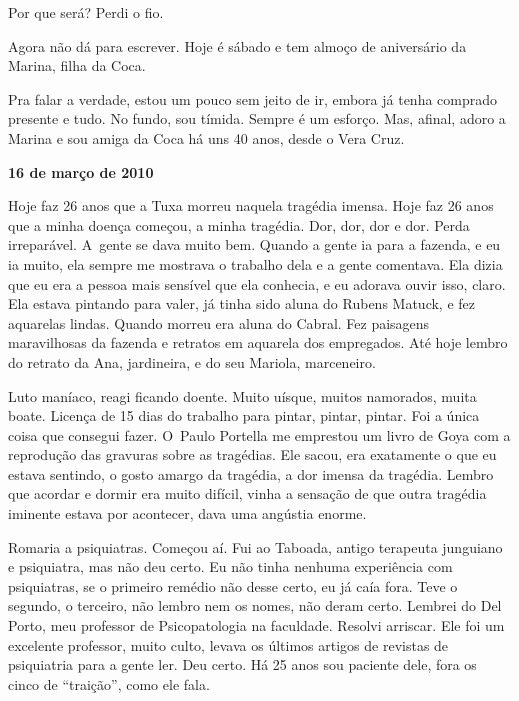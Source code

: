 Por que será? Perdi o fio.

Agora não dá para escrever. Hoje é sábado e tem almoço de aniversário da
Marina, filha da Coca.

Pra falar a verdade, estou um pouco sem jeito de ir, embora já tenha
comprado presente e tudo. No fundo, sou tímida. Sempre é um esforço. Mas,
afinal, adoro a Marina e sou amiga da Coca há uns 40 anos, desde o Vera
Cruz.

\begin{center}\textbf{\asterisc{}}\end{center}


\begin{flushright}\textbf{16 de março de 2010}\end{flushright}


Hoje faz 26 anos que a Tuxa morreu naquela tragédia imensa. Hoje faz
26 anos que a minha doença começou, a minha tragédia. Dor,
dor, dor e dor. Perda irreparável. A~gente se dava muito bem. Quando a
gente ia para a fazenda, e eu ia muito, ela sempre me mostrava o
trabalho dela e a gente comentava. Ela dizia que eu era a pessoa mais
sensível que ela conhecia, e eu adorava ouvir isso, claro. Ela estava
pintando para valer, já tinha sido aluna do Rubens Matuck, e fez
aquarelas lindas. Quando morreu era aluna do Cabral. Fez paisagens
maravilhosas da fazenda e retratos em aquarela dos empregados. Até hoje
lembro do retrato da Ana, jardineira, e do seu Mariola, marceneiro.

Luto maníaco, reagi ficando doente. Muito uísque, muitos namorados,
muita boate. Licença de 15 dias do trabalho para pintar, pintar, pintar.
Foi a única coisa que consegui fazer. O~Paulo Portella me emprestou um
livro de Goya com a reprodução das gravuras sobre as tragédias. Ele
sacou, era exatamente o que eu estava sentindo, o gosto amargo da
tragédia, a dor imensa da tragédia. Lembro que acordar e dormir era
muito difícil, vinha a sensação de que outra tragédia iminente estava
por acontecer, dava uma angústia enorme.

Romaria a psiquiatras. Começou aí. Fui ao Taboada, antigo terapeuta
junguiano e psiquiatra, mas não deu certo. Eu não tinha nenhuma
experiência com psiquiatras, se o primeiro remédio não desse certo, eu
já caía fora. Teve o segundo, o terceiro, não lembro nem os nomes, não
deram certo. Lembrei do Del Porto, meu professor de Psicopatologia na
faculdade. Resolvi arriscar. Ele foi um excelente professor, muito
culto, levava os últimos artigos de revistas de psiquiatria para a gente
ler. Deu certo. Há 25 anos sou paciente dele, fora os cinco de
``traição'', como ele fala.

